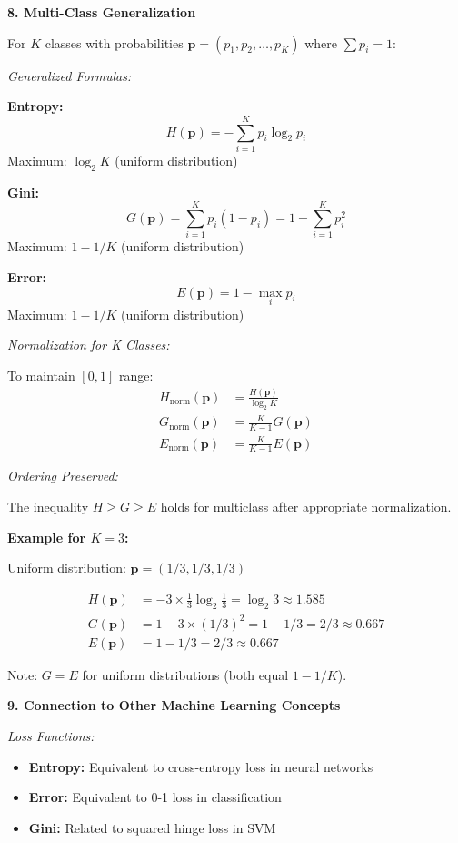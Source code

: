 \documentclass[12pt]{article}
\begin{document}
\begin{explanation}
\textbf{8. Multi-Class Generalization}

For $K$ classes with probabilities $\mathbf{p} = (p_1, p_2, \ldots, p_K)$ where $\sum p_i = 1$:

\textit{Generalized Formulas:}

\textbf{Entropy:}
\[
H(\mathbf{p}) = -\sum_{i=1}^{K} p_i \log_2 p_i
\]
Maximum: $\log_2 K$ (uniform distribution)

\textbf{Gini:}
\[
G(\mathbf{p}) = \sum_{i=1}^{K} p_i(1 - p_i) = 1 - \sum_{i=1}^{K} p_i^2
\]
Maximum: $1 - 1/K$ (uniform distribution)

\textbf{Error:}
\[
E(\mathbf{p}) = 1 - \max_i p_i
\]
Maximum: $1 - 1/K$ (uniform distribution)

\textit{Normalization for K Classes:}

To maintain $[0,1]$ range:
\begin{align*}
H_{\text{norm}}(\mathbf{p}) &= \frac{H(\mathbf{p})}{\log_2 K} \\
G_{\text{norm}}(\mathbf{p}) &= \frac{K}{K-1} G(\mathbf{p}) \\
E_{\text{norm}}(\mathbf{p}) &= \frac{K}{K-1} E(\mathbf{p})
\end{align*}

\textit{Ordering Preserved:}

The inequality $H \geq G \geq E$ holds for multiclass after appropriate normalization.

\textbf{Example for $K=3$:}

Uniform distribution: $\mathbf{p} = (1/3, 1/3, 1/3)$

\begin{align*}
H(\mathbf{p}) &= -3 \times \frac{1}{3}\log_2\frac{1}{3} = \log_2 3 \approx 1.585 \\
G(\mathbf{p}) &= 1 - 3 \times (1/3)^2 = 1 - 1/3 = 2/3 \approx 0.667 \\
E(\mathbf{p}) &= 1 - 1/3 = 2/3 \approx 0.667
\end{align*}

Note: $G = E$ for uniform distributions (both equal $1 - 1/K$).

\textbf{9. Connection to Other Machine Learning Concepts}

\textit{Loss Functions:}

\begin{itemize}
    \item \textbf{Entropy:} Equivalent to cross-entropy loss in neural networks
    \item \textbf{Error:} Equivalent to 0-1 loss in classification
    \item \textbf{Gini:} Related to squared hinge loss in SVM
\end{itemize}


\end{explanation}
\end{document}
